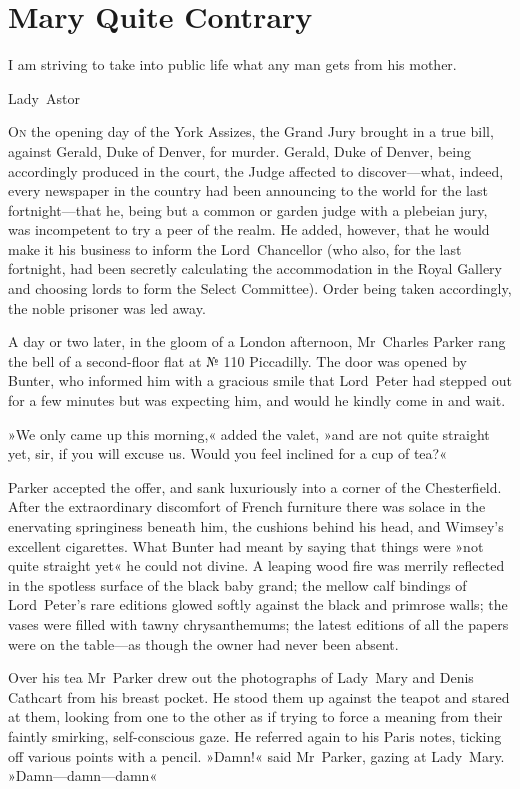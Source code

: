 \chapter{Mary Quite Contrary}

\epigraph{I am striving to take into public life what any man gets from his mother.}{Lady~Astor}


\lettrine[lines=4]{O}{n} the opening day of the York Assizes, the Grand Jury brought in a true bill, against Gerald, Duke of Denver, for murder. Gerald, Duke of Denver, being accordingly produced in the court, the Judge affected to discover—what, indeed, every newspaper in the country had been announcing to the world for the last fortnight—that he, being but a common or garden judge with a plebeian jury, was incompetent to try a peer of the realm. He added, however, that he would make it his business to inform the Lord~Chancellor (who also, for the last fortnight, had been secretly calculating the accommodation in the Royal Gallery and choosing lords to form the Select Committee). Order being taken accordingly, the noble prisoner was led away.


\divider


A day or two later, in the gloom of a London afternoon, Mr~Charles Parker rang the bell of a second-floor flat at № 110 Piccadilly. The door was opened by Bunter, who informed him with a gracious smile that Lord~Peter had stepped out for a few minutes but was expecting him, and would he kindly come in and wait.

»We only came up this morning,« added the valet, »and are not quite straight yet, sir, if you will excuse us. Would you feel inclined for a cup of tea?«

Parker accepted the offer, and sank luxuriously into a corner of the Chesterfield. After the extraordinary discomfort of French furniture there was solace in the enervating springiness beneath him, the cushions behind his head, and Wimsey's excellent cigarettes. What Bunter had meant by saying that things were »not quite straight yet« he could not divine. A leaping wood fire was merrily reflected in the spotless surface of the black baby grand; the mellow calf bindings of Lord~Peter's rare editions glowed softly against the black and primrose walls; the vases were filled with tawny chrysanthemums; the latest editions of all the papers were on the table—as though the owner had never been absent.

Over his tea Mr~Parker drew out the photographs of Lady~Mary and Denis Cathcart from his breast pocket. He stood them up against the teapot and stared at them, looking from one to the other as if trying to force a meaning from their faintly smirking, self-conscious gaze. He referred again to his Paris notes, ticking off various points with a pencil.  »Damn!« said Mr~Parker, gazing at Lady~Mary. »Damn—damn—damn\longdash«

